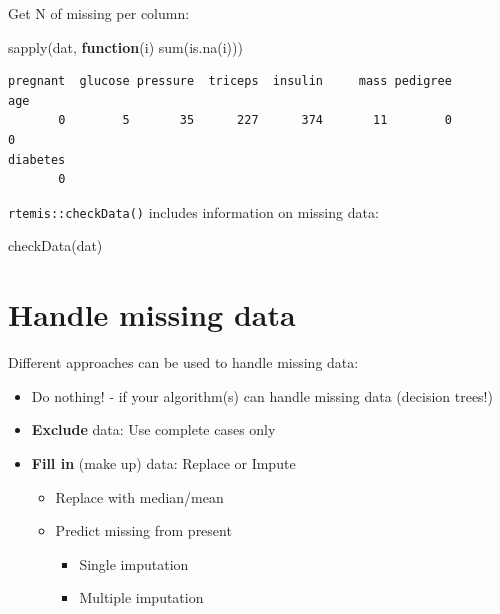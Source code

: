 \documentclass[
]{book}
\newenvironment{Shaded}{\begin{snugshade}}{\end{snugshade}}
\newcommand{\ControlFlowTok}[1]{\textcolor[rgb]{0.13,0.29,0.53}{\textbf{#1}}}
\newcommand{\FunctionTok}[1]{\textcolor[rgb]{0.00,0.00,0.00}{#1}}
\newcommand{\NormalTok}[1]{#1}
\providecommand{\tightlist}{%
  \setlength{\itemsep}{0pt}\setlength{\parskip}{0pt}}
\begin{document}
Get N of missing per column:

\begin{Shaded}
\begin{Highlighting}[]
\FunctionTok{sapply}\NormalTok{(dat, }\ControlFlowTok{function}\NormalTok{(i) }\FunctionTok{sum}\NormalTok{(}\FunctionTok{is.na}\NormalTok{(i)))}
\end{Highlighting}
\end{Shaded}

\begin{verbatim}
pregnant  glucose pressure  triceps  insulin     mass pedigree      age 
       0        5       35      227      374       11        0        0 
diabetes 
       0 
\end{verbatim}

\texttt{rtemis::checkData()} includes information on missing data:

\begin{Shaded}
\begin{Highlighting}[]
\FunctionTok{checkData}\NormalTok{(dat)}
\end{Highlighting}
\end{Shaded}

\hypertarget{handle-missing-data}{%
\section{Handle missing data}\label{handle-missing-data}}

Different approaches can be used to handle missing data:

\begin{itemize}
\tightlist
\item
  Do nothing! - if your algorithm(s) can handle missing data (decision trees!)
\item
  \textbf{Exclude} data: Use complete cases only
\item
  \textbf{Fill in} (make up) data: Replace or Impute

  \begin{itemize}
  \tightlist
  \item
    Replace with median/mean
  \item
    Predict missing from present

    \begin{itemize}
    \tightlist
    \item
      Single imputation
    \item
      Multiple imputation
    \end{itemize}
  \end{itemize}
\end{itemize}
\end{document}
